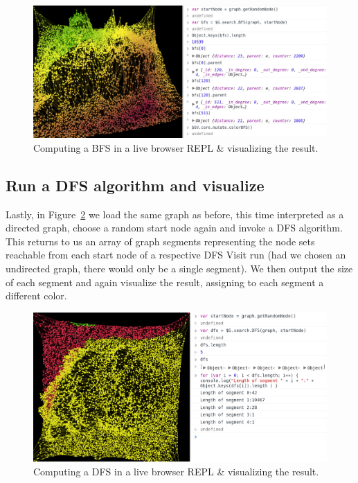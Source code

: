 	\begin{figure}[H]
		\begin{center}
			\includegraphics [width=1\textwidth] {figures/colorBFSREPL}
			\caption{Computing a BFS in a live browser REPL \& visualizing the result.}
			\label{fig:color_graph_bfs}
		\end{center}
	\end{figure}
	
	
	\subsection{Run a DFS algorithm and visualize}
	\label{ssect:run_dfs_visualize}
	
	Lastly, in Figure~\ref{fig:color_graph_dfs} we load the same graph as before, this time interpreted as a directed graph, choose a random start node again and invoke a DFS algorithm. This returns to us an array of graph segments representing the node sets reachable from each start node of a respective DFS Visit run (had we chosen an undirected graph, there would only be a single segment). We then output the size of each segment and again visualize the result, assigning to each segment a different color.
	
	\begin{figure}[H]
		\begin{center}
			\includegraphics [width=1\textwidth] {figures/colorDFSREPL}
			\caption{Computing a DFS in a live browser REPL \& visualizing the result.}
			\label{fig:color_graph_dfs}
		\end{center}
	\end{figure}	


